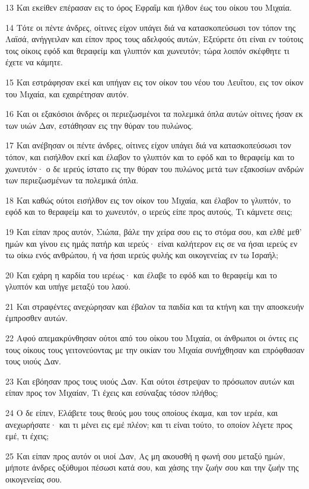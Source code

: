\par 13 Και εκείθεν επέρασαν εις το όρος Εφραΐμ και ήλθον έως του οίκου του Μιχαία.
\par 14 Τότε οι πέντε άνδρες, οίτινες είχον υπάγει διά να κατασκοπεύσωσι τον τόπον της Λαϊσά, ανήγγειλαν και είπον προς τους αδελφούς αυτών, Εξεύρετε ότι είναι εν τούτοις τοις οίκοις εφόδ και θεραφείμ και γλυπτόν και χωνευτόν; τώρα λοιπόν σκέφθητε τι έχετε να κάμητε.
\par 15 Και εστράφησαν εκεί και υπήγαν εις τον οίκον του νέου του Λευΐτου, εις τον οίκον του Μιχαία, και εχαιρέτησαν αυτόν.
\par 16 Και οι εξακόσιοι άνδρες οι περιεζωσμένοι τα πολεμικά όπλα αυτών οίτινες ήσαν εκ των υιών Δαν, εστάθησαν εις την θύραν του πυλώνος.
\par 17 Και ανέβησαν οι πέντε άνδρες, οίτινες είχον υπάγει διά να κατασκοπεύσωσι τον τόπον, και εισήλθον εκεί και έλαβον το γλυπτόν και το εφόδ και το θεραφείμ και το χωνευτόν· ο δε ιερεύς ίστατο εις την θύραν του πυλώνος μετά των εξακοσίων ανδρών των περιεζωσμένων τα πολεμικά όπλα.
\par 18 Και καθώς ούτοι εισήλθον εις τον οίκον του Μιχαία, και έλαβον το γλυπτόν, το εφόδ και το θεραφείμ και το χωνευτόν, ο ιερεύς είπε προς αυτούς, Τι κάμνετε σεις;
\par 19 Και είπαν προς αυτόν, Σιώπα, βάλε την χείρα σου εις το στόμα σου, και ελθέ μεθ' ημών και γίνου εις ημάς πατήρ και ιερεύς· είναι καλήτερον εις σε να ήσαι ιερεύς εν τω οίκω ενός ανθρώπου, ή να ήσαι ιερεύς φυλής και οικογενείας εν τω Ισραήλ;
\par 20 Και εχάρη η καρδία του ιερέως· και έλαβε το εφόδ και το θεραφείμ και το γλυπτόν και υπήγε μεταξύ του λαού.
\par 21 Και στραφέντες ανεχώρησαν και έβαλον τα παιδία και τα κτήνη και την αποσκευήν έμπροσθεν αυτών.
\par 22 Αφού απεμακρύνθησαν ούτοι από του οίκου του Μιχαία, οι άνθρωποι οι όντες εις τους οίκους τους γειτονεύοντας με την οικίαν του Μιχαία συνήχθησαν και επρόφθασαν τους υιούς Δαν.
\par 23 Και εβόησαν προς τους υιούς Δαν. Και ούτοι έστρεψαν το πρόσωπον αυτών και είπαν προς τον Μιχαίαν, Τι έχεις και εσύναξας τόσον πλήθος;
\par 24 Ο δε είπεν, Ελάβετε τους θεούς μου τους οποίους έκαμα, και τον ιερέα, και ανεχωρήσατε· και τι μένει εις εμέ πλέον; και τι είναι τούτο, το οποίον λέγετε προς εμέ, τι έχεις;
\par 25 Και είπαν προς αυτόν οι υιοί Δαν, Ας μη ακουσθή η φωνή σου μεταξύ ημών, μήποτε άνδρες οξύθυμοι πέσωσι κατά σου, και χάσης την ζωήν σου και την ζωήν της οικογενείας σου.
